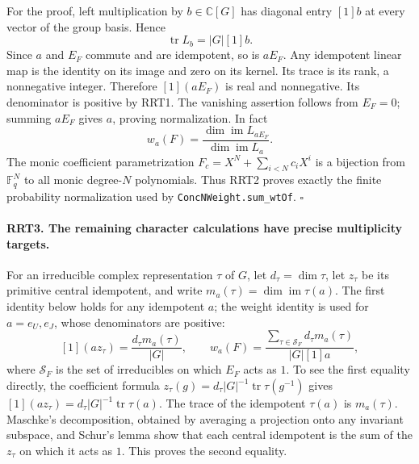 For the proof, left multiplication by $b\in\mathbb C[G]$ has
diagonal entry $[1]b$ at every vector of the group basis.  Hence
\[
                 \operatorname{tr}L_b=|G|[1]b.
 \tag{RRT.6}
\]
Since $a$ and $E_F$ commute and are idempotent, so is $aE_F$.
Any idempotent linear map is the identity on its image and zero on
its kernel.  Its trace is its rank, a nonnegative integer.
Therefore $[1](aE_F)$ is real and nonnegative.  Its denominator
is positive by RRT1.  The vanishing assertion follows from
$E_F=0$; summing $aE_F$ gives $a$, proving normalization.
In fact
\[
 w_a(F)=\frac{\dim\operatorname{im}L_{aE_F}}
                     {\dim\operatorname{im}L_a}.
 \tag{RRT.7}
\]
The monic coefficient parametrization
$F_c=X^N+\sum_{i<N}c_iX^i$ is a bijection from
$\mathbb F_q^N$ to all monic degree-$N$ polynomials.  Thus
RRT2 proves exactly the finite probability normalization used by
\texttt{ConcNWeight.sum\_wtOf}.
\hfill$\square$

\paragraph{RRT3. The remaining character calculations have precise multiplicity targets.}
\label{claim:RRT3}
For an irreducible complex representation $\tau$ of $G$, let
$d_\tau=\dim\tau$, let $z_\tau$ be its primitive central
idempotent, and write $m_a(\tau)=\dim\operatorname{im}\tau(a)$.
The first identity below holds for any idempotent $a$; the
weight identity is used for $a=e_U,e_J$, whose denominators
are positive:
\[
 [1](az_\tau)=\frac{d_\tau m_a(\tau)}{|G|},\qquad
 w_a(F)=\frac{\sum_{\tau\in\mathcal S_F}d_\tau m_a(\tau)}
                                      {|G|[1]a},
 \tag{RRT.8}
\]
where $\mathcal S_F$ is the set of irreducibles on which $E_F$
acts as $1$.  To see the first equality directly, the coefficient
formula
$z_\tau(g)=d_\tau|G|^{-1}\operatorname{tr}\tau(g^{-1})$
gives $[1](az_\tau)=d_\tau|G|^{-1}\operatorname{tr}\tau(a)$.
The trace of the idempotent $\tau(a)$ is $m_a(\tau)$.
Maschke's decomposition, obtained by averaging a projection onto
any invariant subspace, and Schur's lemma show that each central
idempotent is the sum of the $z_\tau$ on which it acts as $1$.
This proves the second equality.

